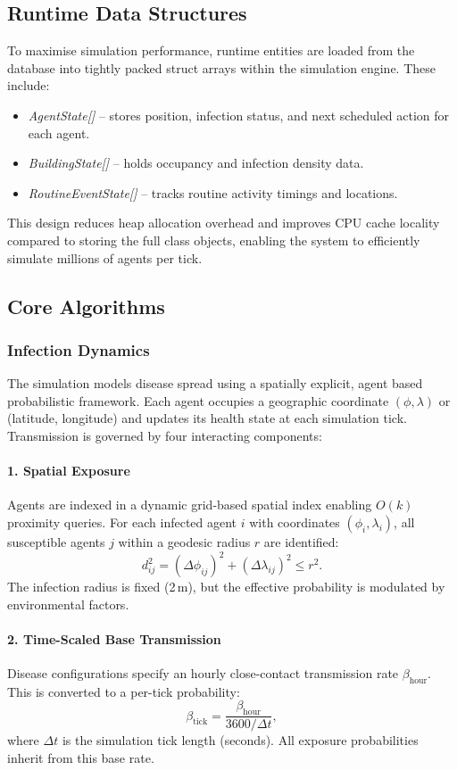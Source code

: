 \subsection{Runtime Data Structures}
To maximise simulation performance, runtime entities are loaded from the database into tightly packed struct arrays within the simulation engine. These include:
\begin{itemize}
    \item \textit{AgentState[]} – stores position, infection status, and next scheduled action for each agent.
    \item \textit{BuildingState[]} – holds occupancy and infection density data.
    \item \textit{RoutineEventState[]} – tracks routine activity timings and locations.
\end{itemize}

This design reduces heap allocation overhead and improves CPU cache locality compared to storing the full class objects, enabling the system to efficiently simulate millions of agents per tick.

\subsection{Core Algorithms}

\subsubsection*{Infection Dynamics}

The simulation models disease spread using a spatially explicit, agent based probabilistic framework. Each agent occupies a geographic coordinate $(\phi, \lambda)$ or (latitude, longitude) and updates its health state at each simulation tick. Transmission is governed by four interacting components:

\paragraph*{1. Spatial Exposure}
Agents are indexed in a dynamic grid-based spatial index enabling $O(k)$ proximity queries. For each infected agent $i$ with coordinates $(\phi_i, \lambda_i)$, all susceptible agents $j$ within a geodesic radius $r$ are identified:
\[
d_{ij}^2 = (\Delta \phi_{ij})^2 + (\Delta \lambda_{ij})^2 \le r^2.
\]
The infection radius is fixed (2\,m), but the effective probability is modulated by environmental factors.

\paragraph*{2. Time-Scaled Base Transmission}
Disease configurations specify an hourly close-contact transmission rate $\beta_\mathrm{hour}$. This is converted to a per-tick probability:
\[
\beta_\mathrm{tick} = \frac{\beta_\mathrm{hour}}{3600 / \Delta t},
\]
where $\Delta t$ is the simulation tick length (seconds). All exposure probabilities inherit from this base rate.

